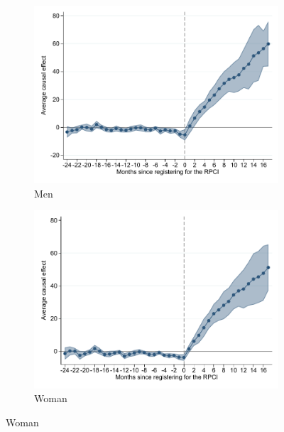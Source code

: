 \documentclass[oneside,11pt]{article}
\begin{document}
\begin{figure}[H]
    \caption{Event studies - RPCI effect on wage by worker characteristics}
    \label{event_study_worker_characteristics}
    \begin{center}
    
    \begin{subfigure}{0.49\textwidth}
    \caption{Men}
    \includegraphics[width=\textwidth]{04_Figures/muestra_10porciento/event_study_sal_cierre_chaisemartin_sexo_0.pdf}
    \end{subfigure}
    \begin{subfigure}{0.49\textwidth}
    \caption{Woman}
    \includegraphics[width=\textwidth]{04_Figures/muestra_10porciento/event_study_sal_cierre_chaisemartin_sexo_1.pdf}
    \end{subfigure}
    

\end{center}
\end{figure}
\end{document}
